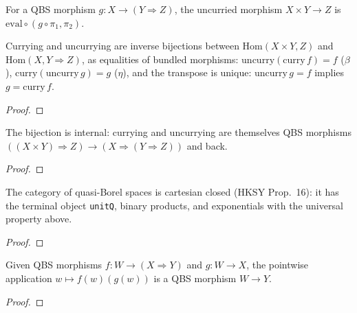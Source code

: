 \begin{definition}[Uncurrying]\label{def:qbs_uncurry}
  \rocqok
  For a QBS morphism $g : X \to (Y \Rightarrow Z)$, the uncurried morphism
  $X \times Y \to Z$ is $\mathrm{eval} \circ (g \circ \pi_1, \pi_2)$.
\end{definition}

\begin{theorem}\label{thm:qbs_curry_universal}
  \rocqok
  Currying and uncurrying are inverse bijections between
  $\mathrm{Hom}(X \times Y, Z)$ and $\mathrm{Hom}(X, Y \Rightarrow Z)$, as
  equalities of bundled morphisms: $\mathrm{uncurry}(\mathrm{curry}\,f) = f$
  ($\beta$), $\mathrm{curry}(\mathrm{uncurry}\,g) = g$ ($\eta$), and the
  transpose is unique: $\mathrm{uncurry}\, g = f$ implies
  $g = \mathrm{curry}\, f$.
\end{theorem}
\begin{proof}\rocqok\end{proof}

\begin{lemma}\label{lem:qbs_curry_exp}
  \rocqok
  The bijection is internal: currying and uncurrying are themselves QBS
  morphisms $((X \times Y) \Rightarrow Z) \to (X \Rightarrow (Y \Rightarrow Z))$
  and back.
\end{lemma}
\begin{proof}\rocqok\end{proof}

\begin{corollary}\label{cor:cartesian_closure}
  \rocqok
  The category of quasi-Borel spaces is cartesian closed
  (HKSY Prop.~16): it has the terminal object \texttt{unitQ},
  binary products, and exponentials with the universal property above.
\end{corollary}
\begin{proof}\rocqok\end{proof}

\begin{lemma}\label{lem:qbs_morphism_exp_comp}
  \rocqok
  Given QBS morphisms $f : W \to (X \Rightarrow Y)$ and $g : W \to X$,
  the pointwise application $w \mapsto f(w)(g(w))$ is a QBS morphism
  $W \to Y$.
\end{lemma}
\begin{proof}\rocqok\end{proof}


